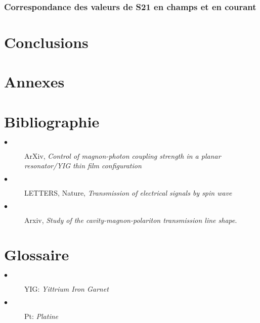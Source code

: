 \documentclass[12pt,fleqn]{book} %
\begin{document}
\section{Correspondance des valeurs de S21 en champs et en courant}



\part{Conclusions}

\setcounter{part}{-5}
\part{Annexes}

\setcounter{part}{-6}
\part{Bibliographie}
\label{Sources}
\appendix
\begin{description}
 \item[$\bullet$] ArXiv, \emph{Control of magnon-photon coupling strength in a planar resonator/YIG thin film configuration}
 \item[$\bullet$] LETTERS, Nature, \emph{Transmission of electrical signals by spin wave}
 \item[$\bullet$] Arxiv, \emph{Study of the cavity-magnon-polariton transmission line shape}.
\end{description}

\setcounter{part}{-7}
\part{Glossaire}
\begin{description}
 \item[$\bullet$] YIG: \emph{Yittrium Iron Garnet}
 \item[$\bullet$] Pt: \emph{Platine}
\end{description}
\end{document}
